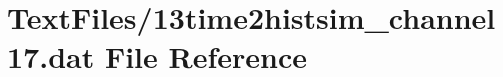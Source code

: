 \hypertarget{13time2histsim__channel17_8dat}{}\section{Text\+Files/13time2histsim\+\_\+channel17.dat File Reference}
\label{13time2histsim__channel17_8dat}
